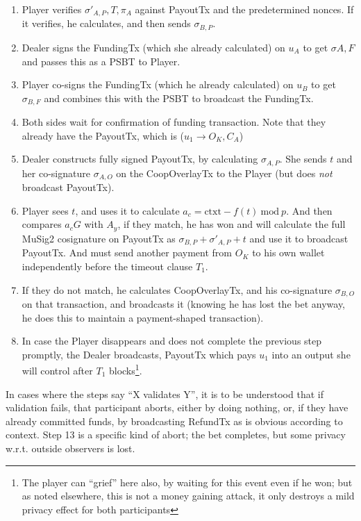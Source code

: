 \documentclass[11pt]{article}
\begin{document}
\begin{enumerate}
\item Player verifies $\sigma'_{A, P}, T, \pi_A$ against PayoutTx and the predetermined nonces. If it verifies, he calculates, and then sends $\sigma_{B,P}$.
\item Dealer signs the FundingTx (which she already calculated) on $u_A$ to get $\sigma{A, F}$ and passes this as a PSBT to Player.
\item Player co-signs the FundingTx (which he already calculated) on $u_B$ to get $\sigma_{B, F}$ and combines this with the PSBT to broadcast the FundingTx.
\item Both sides wait for confirmation of funding transaction. Note that they already have the PayoutTx, which is ($u_1 \rightarrow O_K, C_A$)
\item Dealer constructs fully signed PayoutTx, by calculating $\sigma_{A,P}$. She sends $t$ and her co-signature $\sigma_{A, O}$ on the CoopOverlayTx to the Player (but does \emph{not} broadcast PayoutTx).
\item Player sees $t$, and uses it to calculate $a_c = \textrm{ctxt} - f(t) \ \textrm{mod}\ p$. And then compares $a_c G$ with $A_y$, if they match, he has won and will calculate the full MuSig2 cosignature on PayoutTx as $\sigma_{B,P} + \sigma'_{A, P} + t$ and use it to broadcast PayoutTx. And must send another payment from $O_K$ to his own wallet independently before the timeout clause $T_1$.
\item If they do not match, he calculates CoopOverlayTx, and his co-signature $\sigma_{B,O}$ on that transaction, and broadcasts it (knowing he has lost the bet anyway, he does this to maintain a payment-shaped transaction).
\item In case the Player disappears and does not complete the previous step promptly, the Dealer broadcasts, PayoutTx which pays $u_1$ into an output she will control after $T_1$ blocks\footnote{The player can ``grief'' here also, by waiting for this event even if he won; but as noted elsewhere, this is not a money gaining attack, it only destroys a mild privacy effect for both participants}.
\end{enumerate}

In cases where the steps say ``X validates Y'', it is to be understood that if validation fails, that participant aborts, either by doing nothing, or, if they have already committed funds, by broadcasting RefundTx as is obvious according to context. Step 13 is a specific kind of abort; the bet completes, but some privacy w.r.t. outside observers is lost.
\end{document}
